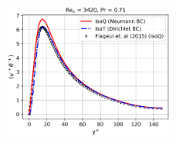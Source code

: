 \begin{figure}[H]
  \centering  
  \caption{}
  \label{fig:flageul}
\end{figure}

\begin{figure}[H]
  \centering  
    \includegraphics[width=0.49\textwidth]{figures/cap4/flageul/tep_up_thetap.png}
    \label{fig:flageul-up-thetap}
  \caption{}
  \label{fig:flageul}
\end{figure}


